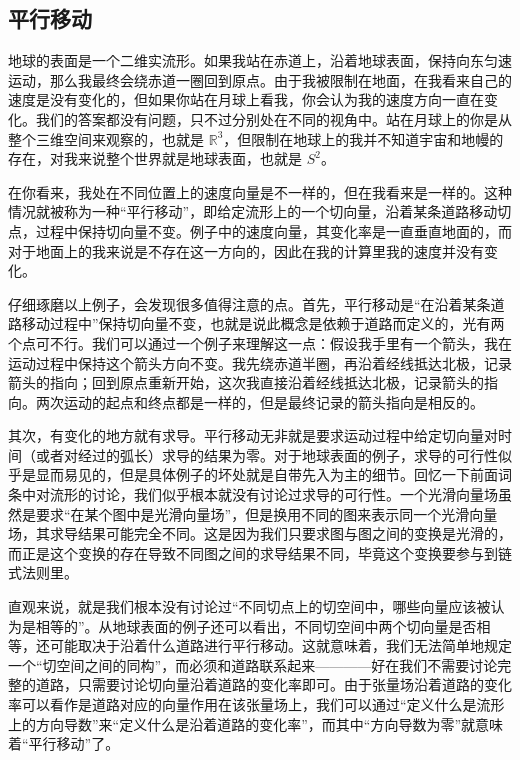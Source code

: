 


\subsection{平行移动}

地球的表面是一个二维实流形。如果我站在赤道上，沿着地球表面，保持向东匀速运动，那么我最终会绕赤道一圈回到原点。由于我被限制在地面，在我看来自己的速度是没有变化的，但如果你站在月球上看我，你会认为我的速度方向一直在变化。我们的答案都没有问题，只不过分别处在不同的视角中。站在月球上的你是从整个三维空间来观察的，也就是 $\mathbb{R}^3$，但限制在地球上的我并不知道宇宙和地幔的存在，对我来说整个世界就是地球表面，也就是 $S^2$。

在你看来，我处在不同位置上的速度向量是不一样的，但在我看来是一样的。这种情况就被称为一种“平行移动”，即给定流形上的一个切向量，沿着某条道路移动切点，过程中保持切向量不变。例子中的速度向量，其变化率是一直垂直地面的，而对于地面上的我来说是不存在这一方向的，因此在我的计算里我的速度并没有变化。

仔细琢磨以上例子，会发现很多值得注意的点。首先，平行移动是“在沿着某条道路移动过程中”保持切向量不变，也就是说此概念是依赖于道路而定义的，光有两个点可不行。我们可以通过一个例子来理解这一点：假设我手里有一个箭头，我在运动过程中保持这个箭头方向不变。我先绕赤道半圈，再沿着经线抵达北极，记录箭头的指向；回到原点重新开始，这次我直接沿着经线抵达北极，记录箭头的指向。两次运动的起点和终点都是一样的，但是最终记录的箭头指向是相反的。

其次，有变化的地方就有求导。平行移动无非就是要求运动过程中给定切向量对时间（或者对经过的弧长）求导的结果为零。对于地球表面的例子，求导的可行性似乎是显而易见的，但是具体例子的坏处就是自带先入为主的细节。回忆一下前面词条中对流形的讨论，我们似乎根本就没有讨论过求导的可行性。一个光滑向量场虽然是要求“在某个图中是光滑向量场”，但是换用不同的图来表示同一个光滑向量场，其求导结果可能完全不同。这是因为我们只要求图与图之间的变换是光滑的，而正是这个变换的存在导致不同图之间的求导结果不同，毕竟这个变换要参与到链式法则里。

直观来说，就是我们根本没有讨论过“不同切点上的切空间中，哪些向量应该被认为是相等的”。从地球表面的例子还可以看出，不同切空间中两个切向量是否相等，还可能取决于沿着什么道路进行平行移动。这就意味着，我们无法简单地规定一个“切空间之间的同构”，而必须和道路联系起来————好在我们不需要讨论完整的道路，只需要讨论切向量沿着道路的变化率即可。由于张量场沿着道路的变化率可以看作是道路对应的向量作用在该张量场上，我们可以通过“定义什么是流形上的方向导数”来“定义什么是沿着道路的变化率”，而其中“方向导数为零”就意味着“平行移动”了。

